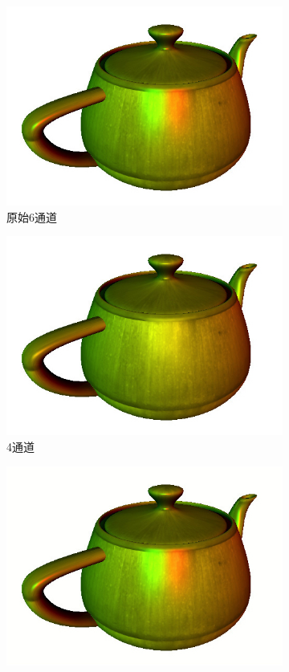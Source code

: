 \begin{figure}
	\begin{subfigure}[b]{0.32\textwidth}
		\includegraphics[width=1.\textwidth]{figures/shade/deferred-lighting-1}
		\caption{原始6通道}
	\end{subfigure}
	\begin{subfigure}[b]{0.32\textwidth}
		\includegraphics[width=1.\textwidth]{figures/shade/deferred-lighting-2}
		\caption{4通道}
	\end{subfigure}
	\begin{subfigure}[b]{0.32\textwidth}
		\includegraphics[width=1.\textwidth]{figures/shade/deferred-lighting-3}

\end{subfigure}
\end{figure}
